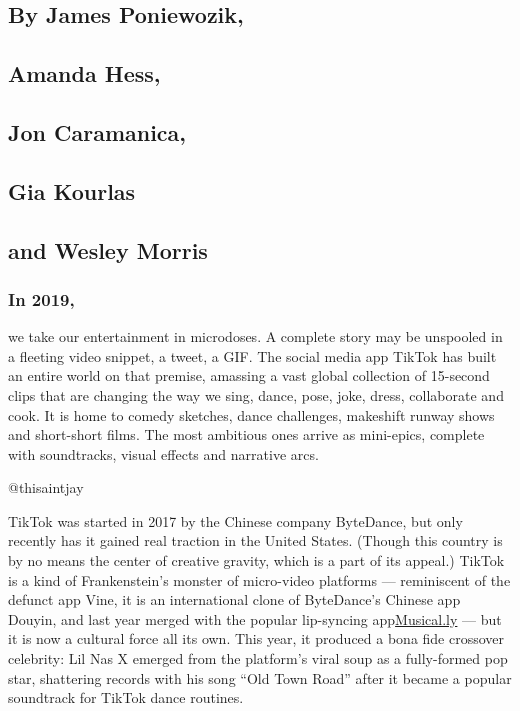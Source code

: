 \hypertarget{by-james-poniewozik}{%
\subsection{By James Poniewozik,}\label{by-james-poniewozik}}

\hypertarget{amanda-hess}{%
\subsection{Amanda Hess,}\label{amanda-hess}}

\hypertarget{jon-caramanica}{%
\subsection{Jon Caramanica,}\label{jon-caramanica}}

\hypertarget{gia-kourlas}{%
\subsection{Gia Kourlas}\label{gia-kourlas}}

\hypertarget{and-wesley-morris}{%
\subsection{and Wesley Morris}\label{and-wesley-morris}}

\hypertarget{in-2019}{%
\subsubsection{In 2019,}\label{in-2019}}

we take our entertainment in microdoses. A complete story may be
unspooled in a fleeting video snippet, a tweet, a GIF. The social media
app TikTok has built an entire world on that premise, amassing a vast
global collection of 15-second clips that are changing the way we sing,
dance, pose, joke, dress, collaborate and cook. It is home to comedy
sketches, dance challenges, makeshift runway shows and short-short
films. The most ambitious ones arrive as mini-epics, complete with
soundtracks, visual effects and narrative arcs.

\href{https://www.tiktok.com/@thisaintjay/video/6734489584509537541}{}

@thisaintjay

TikTok was started in 2017 by the Chinese company ByteDance, but only
recently has it gained real traction in the United States. (Though this
country is by no means the center of creative gravity, which is a part
of its appeal.) TikTok is a kind of Frankenstein's monster of
micro-video platforms --- reminiscent of the defunct app Vine, it is an
international clone of ByteDance's Chinese app Douyin, and last year
merged with the popular lip-syncing
app\href{http://musical.ly/}{}\href{http://musical.ly/}{Musical.ly} ---
but it is now a cultural force all its own. This year, it produced a
bona fide crossover celebrity: Lil Nas X emerged from the platform's
viral soup as a fully-formed pop star, shattering records with his song
``Old Town Road'' after it became a popular soundtrack for TikTok dance
routines.

